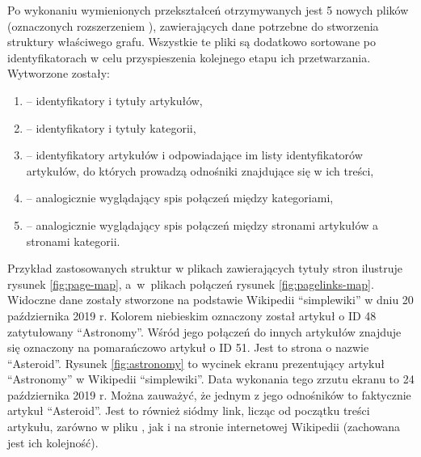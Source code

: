 Po wykonaniu wymienionych przekształceń otrzymywanych jest 5 nowych plików (oznaczonych rozszerzeniem ), zawierających dane potrzebne do stworzenia struktury właściwego grafu. Wszystkie te pliki są dodatkowo sortowane po identyfikatorach w celu przyspieszenia kolejnego etapu ich przetwarzania. Wytworzone zostały:

\begin{enumerate}[label=\textbullet]
    \item {} – identyfikatory i tytuły artykułów,
    \item {} – identyfikatory i tytuły kategorii,
    \item {} – identyfikatory artykułów i odpowiadające im listy identyfikatorów artykułów, do których prowadzą odnośniki znajdujące się w ich treści,
    \item {} – analogicznie wyglądający spis połączeń między kategoriami,
    \item {} – analogicznie wyglądający spis połączeń między stronami artykułów a stronami kategorii.
\end{enumerate}

Przykład zastosowanych struktur w plikach zawierających tytuły stron ilustruje rysunek \ref{fig:page-map}, a~w~plikach połączeń rysunek \ref{fig:pagelinks-map}. Widoczne dane zostały stworzone na podstawie Wikipedii ``simplewiki'' w dniu 20 października 2019 r. Kolorem niebieskim oznaczony został artykuł o ID 48 zatytułowany ``Astronomy''. Wśród jego połączeń do innych artykułów znajduje się oznaczony na pomarańczowo artykuł o ID 51. Jest to strona o nazwie ``Asteroid''. Rysunek \ref{fig:astronomy} to wycinek ekranu prezentujący artykuł ``Astronomy'' w Wikipedii ``simplewiki''. Data wykonania tego zrzutu ekranu to 24 października 2019 r. Można zauważyć, że jednym z jego odnośników to faktycznie artykuł ``Asteroid''. Jest to również siódmy link, licząc od początku treści artykułu, zarówno w pliku , jak i na stronie internetowej Wikipedii (zachowana jest ich kolejność).



